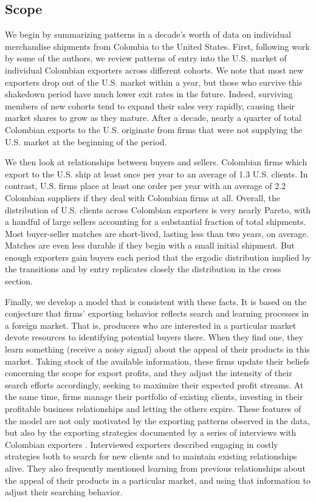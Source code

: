 \documentclass[12pt,titlepage]{article}
\begin{document}
\subsection{Scope}

We begin by summarizing patterns in a decade's worth of data on individual
merchandise shipments from Colombia to the United States. First, following
work by some of the authors,\citep{eaton2008nthe} we review patterns of
entry into the U.S. market of individual Colombian exporters across
different cohorts. We note that most new exporters drop out of the U.S.
market within a year, but those who survive this shakedown period have much
lower exit rates in the future. Indeed, surviving members of new cohorts
tend to expand their sales very rapidly, causing their market shares to grow
as they mature. After a decade, nearly a quarter of total Colombian exports
to the U.S. originate from firms that were not supplying the U.S. market at
the beginning of the period.

We then look at relationships between buyers and sellers. Colombian firms
which export to the U.S. ship at least once per year to an average of 1.3
U.S. clients. In contrast, U.S. firms place at least one order per year with
an average of 2.2 Colombian suppliers if they deal with Colombian firms at
all. Overall, the distribution of U.S. clients across Colombian exporters is
very nearly Pareto, with a handful of large sellers accounting for a
substantial fraction of total shipments. Most buyer-seller matches are
short-lived, lasting less than two years, on average. Matches are even less
durable if they begin with a small initial shipment. But enough exporters
gain buyers each period that the ergodic distribution implied by the
transitions and by entry replicates closely the distribution in the cross
section.

Finally, we develop a model that is consistent with these facts. It is based
on the conjecture that firms' exporting behavior reflects search and
learning processes in a foreign market. That is, producers who are
interested in a particular market devote resources to identifying potential
buyers there. When they find one, they learn something (receive a noisy
signal) about the appeal of their products in this market. Taking stock of
the available information, these firms update their beliefs concerning the
scope for export profits, and they adjust the intensity of their search
efforts accordingly, seeking to maximize their expected profit streams. At
the same time, firms manage their portfolio of existing clients, investing
in their profitable business relationships and letting the others expire.
These features of the model are not only motivated by the exporting patterns
observed in the data, but also by the exporting strategies documented by a
series of interviews with Colombian exporters \citep{dominguez2010search}.
Interviewed exporters described engaging in costly strategies both to search
for new clients and to maintain existing relationships alive. They also
frequently mentioned learning from previous relationships about the appeal
of their products in a particular market, and using that information to
adjust their searching behavior.
\end{document}
